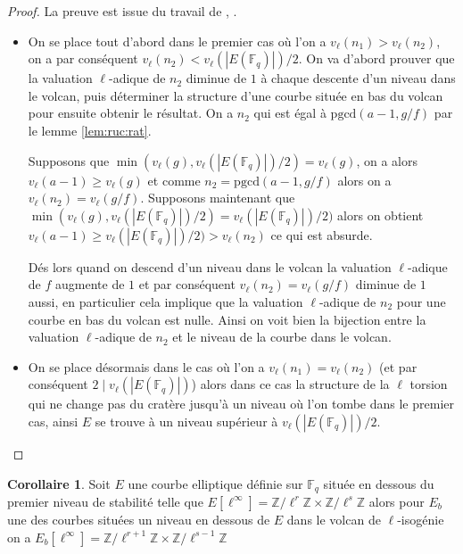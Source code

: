 \documentclass[10pt,a4paper]{book}
\theoremstyle{plain}
\theoremstyle{definition}
\theoremstyle{definition}
\newtheorem{cor}[thm]{Corollaire}
\theoremstyle{definition}
\theoremstyle{definition}
\theoremstyle{remark}
\theoremstyle{remark}
\theoremstyle{definition}
\begin{document}
\begin{proof}
La preuve est issue du travail de \cite{MiretMSTV08}, \cite{Ionica2010}.
\begin{itemize}
\item On se place tout d'abord dans le premier cas où l'on a $v_{\ell}(n_1)>v_{\ell}(n_2)$, on a par conséquent $v_{\ell}(n_2) < v_{\ell}(|E(\mathbb{F}_q)|)/2$. On va d'abord prouver que la valuation $\ell$-adique de $n_2$ diminue de $1$ à chaque descente d'un niveau dans le volcan, puis déterminer la structure d'une courbe située en bas du volcan pour ensuite obtenir le résultat.  On a $n_2$ qui est égal à $\mathrm{pgcd}(a-1,g/f)$ par le lemme \ref{lem:ruc:rat}.

Supposons que $\min(v_{\ell}(g),v_{\ell}(|E(\mathbb{F}_q)|)/2)= v_{\ell}(g)$, on a alors $v_{\ell}(a-1) \geqslant v_{\ell}(g)$ et comme $n_2=\mathrm{pgcd}(a-1,g/f)$ alors on a $v_{\ell}(n_2)=v_{\ell}(g/f)$. Supposons maintenant que $\min(v_{\ell}(g),v_{\ell}(|E(\mathbb{F}_q)|)/2)= v_{\ell}(|E(\mathbb{F}_q)|)/2)$ alors on obtient $v_{\ell}(a-1) \geqslant v_{\ell}(|E(\mathbb{F}_q)|)/2) > v_{\ell}(n_2)$ ce qui est absurde. 

Dés lors quand on descend d'un niveau dans le volcan la valuation $\ell$-adique de $f$ augmente de $1$ et par conséquent $v_{\ell}(n_2)=v_{\ell}(g/f)$ diminue de $1$ aussi, en particulier cela implique que la valuation $\ell$-adique de $n_2$ pour une courbe en bas du volcan est nulle. Ainsi on voit bien la bijection entre la valuation $\ell$-adique de $n_2$ et le niveau de la courbe dans le volcan.

\item On se place désormais dans le cas où l'on a $v_{\ell}(n_1)=v_{\ell}(n_2)$ (et par conséquent $2 \mid v_{\ell}(|E(\mathbb{F}_q)|)$) alors dans ce cas la structure de la $\ell$ torsion qui ne change pas du cratère jusqu'à un niveau où l'on tombe dans le premier cas, ainsi $E$ se trouve à un niveau supérieur à $v_{\ell}(|E(\mathbb{F}_q)|)/2$.
\end{itemize}
\end{proof}

\begin{cor}
\label{cor:des:str}
Soit $E$ une courbe elliptique définie sur $\mathbb{F}_q$ située en dessous du premier niveau de stabilité telle que $E[\ell^{\infty}]=\mathbb{Z}/\ell^r\mathbb{Z} \times \mathbb{Z}/\ell^s\mathbb{Z}$ alors pour $E_b$ une des courbes situées un niveau en dessous de $E$ dans le volcan de $\ell$-isogénie on a $E_b[\ell^{\infty}]=\mathbb{Z}/\ell^{r+1}\mathbb{Z} \times \mathbb{Z}/\ell^{s-1}\mathbb{Z}$
\end{cor}
\end{document}
